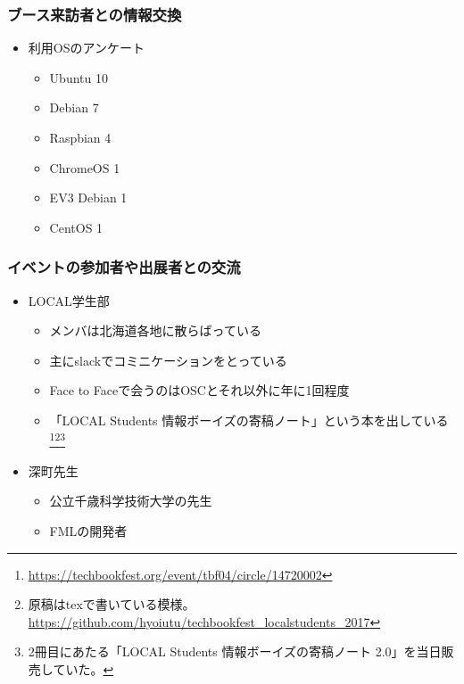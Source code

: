 \documentclass[mingoth,a4paper]{jsarticle}
\begin{document}
\subsubsection{ブース来訪者との情報交換}

\begin{itemize}
\item 利用OSのアンケート
  \begin{itemize}
  \item Ubuntu     10
  \item Debian      7
  \item Raspbian    4
  \item ChromeOS    1
  \item EV3 Debian  1
  \item CentOS      1
  \end{itemize}
\end{itemize}


\subsubsection{イベントの参加者や出展者との交流}

\begin{itemize}
\item LOCAL学生部
  \begin{itemize}
  \item メンバは北海道各地に散らばっている
  \item 主にslackでコミニケーションをとっている
  \item Face to Faceで会うのはOSCとそれ以外に年に1回程度
  \item 「LOCAL Students 情報ボーイズの寄稿ノート」という本を出している\footnote{\url{https://techbookfest.org/event/tbf04/circle/14720002}}\footnote{原稿はtexで書いている模様。\url{https://github.com/hyoiutu/techbookfest_localstudents_2017}}\footnote{2冊目にあたる「LOCAL Students 情報ボーイズの寄稿ノート 2.0」を当日販売していた。}
  \end{itemize}
\end{itemize}

\begin{itemize}
\item 深町先生
  \begin{itemize}
  \item 公立千歳科学技術大学の先生
  \item FMLの開発者
  \end{itemize}
\end{itemize}
\end{document}
